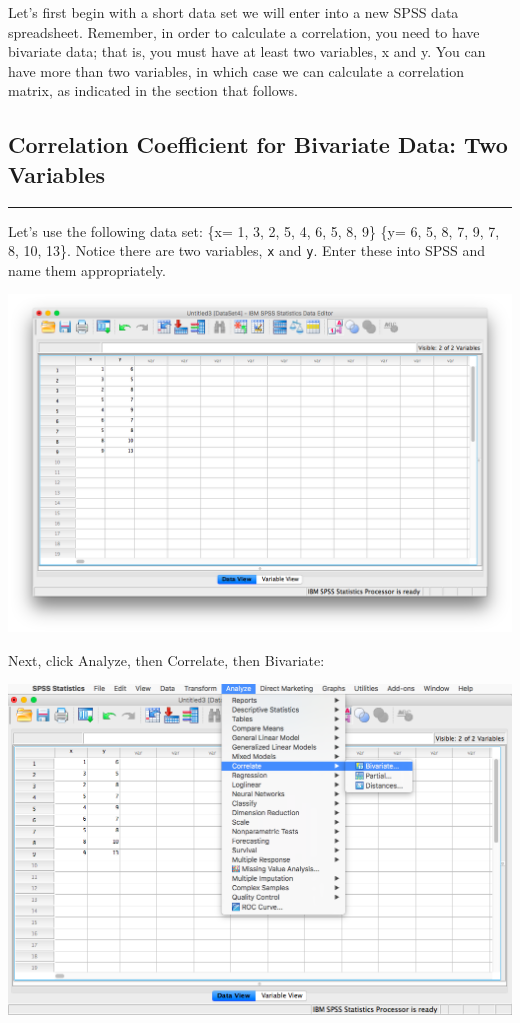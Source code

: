 \documentclass[
]{book}
\begin{document}
Let's first begin with a short data set we will enter into a new SPSS data spreadsheet. Remember, in order to calculate a correlation, you need to have bivariate data; that is, you must have at least two variables, x and y. You can have more than two variables, in which case we can calculate a correlation matrix, as indicated in the section that follows.

\hypertarget{correlation-coefficient-for-bivariate-data-two-variables}{%
\subsection{Correlation Coefficient for Bivariate Data: Two Variables}\label{correlation-coefficient-for-bivariate-data-two-variables}}

\begin{center}\rule{0.5\linewidth}{0.5pt}\end{center}

Let's use the following data set: \{x= 1, 3, 2, 5, 4, 6, 5, 8, 9\} \{y= 6, 5, 8, 7, 9, 7, 8, 10, 13\}. Notice there are two variables, \texttt{x} and \texttt{y}. Enter these into SPSS and name them appropriately.

\includegraphics{img/3.4.11.png}

Next, click {Analyze}, then {Correlate}, then {Bivariate}:

\includegraphics{img/3.4.12.png}
\end{document}

